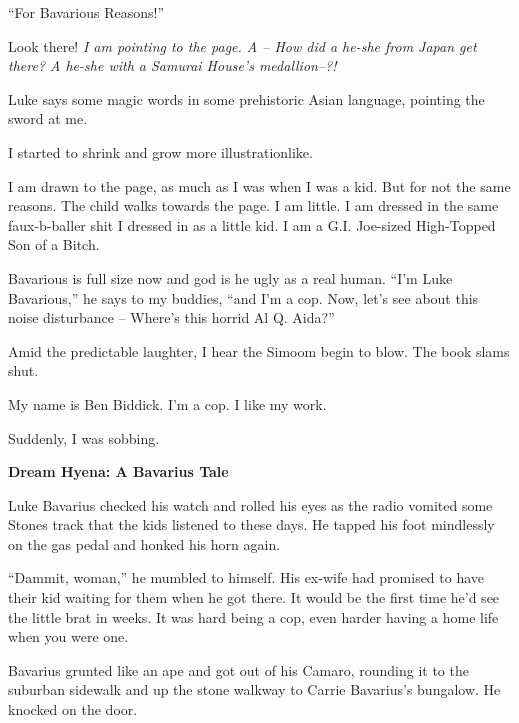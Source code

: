 ``For Bavarious Reasons!''



Look there! {\em I am pointing to the page. A -- How did a he-she
from Japan get there? A he-she with a Samurai House's
medallion--?!}



Luke says some magic words in some prehistoric Asian language,
pointing the sword at me.



I started to shrink and grow more illustrationlike.



I am drawn to the page, as much as I was when I was a kid. But for
not the same reasons. The child walks towards the page. I am
little. I am dressed in the same faux-b-baller shit I dressed in as
a little kid. I am a G.I. Joe-sized High-Topped Son of a
Bitch.



Bavarious is full size now and god is he ugly as a real human. ``I'm
Luke Bavarious,'' he says to my buddies, ``and I'm a cop. Now, let's
see about this noise disturbance -- Where's this horrid Al Q.
Aida?''



Amid the predictable laughter, I hear the Simoom begin to blow. The
book slams shut.



My name is Ben Biddick. I'm a cop. I like my work.





Suddenly, I was sobbing. 
 





{\bf Dream Hyena: A Bavarius Tale}



Luke Bavarius checked his watch and rolled his eyes as the radio
vomited some Stones track that the kids listened to these days. He
tapped his foot mindlessly on the gas pedal and honked his horn
again.



``Dammit, woman,'' he mumbled to himself. His ex-wife had promised to
have their kid waiting for them when he got there. It would be the
first time he'd see the little brat in weeks. It was hard being a
cop, even harder having a home life when you were one.



Bavarius grunted like an ape and got out of his Camaro, rounding it
to the suburban sidewalk and up the stone walkway to Carrie
Bavarius's bungalow. He knocked on the door.



